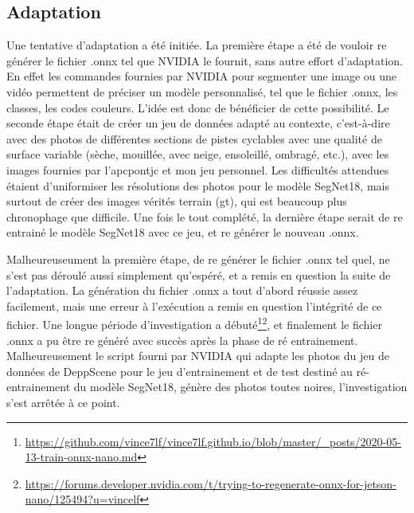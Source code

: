 \subsection{Adaptation}
\par Une tentative d'adaptation a été initiée. La première étape a été de vouloir re générer le fichier .onnx tel que NVIDIA le fournit, sans autre effort d'adaptation. En effet les commandes fournies par NVIDIA pour segmenter une image ou une vidéo permettent de préciser un modèle personnalisé, tel que le fichier .onnx, les classes, les codes couleurs. L'idée est donc de bénéficier de cette possibilité. Le seconde étape était de créer un jeu de données adapté au contexte, c'est-à-dire avec des photos de différentes sections de pistes cyclables avec une qualité de surface variable (sèche, mouillée, avec neige, ensoleillé, ombragé, etc.), avec les images fournies par l'\acrshort{apcpontjc} et mon jeu personnel. Les difficultés attendues étaient d'uniformiser les résolutions des photos pour le modèle SegNet18, mais surtout de créer des images vérités terrain (\acrshort{gt}), qui est beaucoup plus chronophage que difficile. Une fois le tout complété, la dernière étape serait de re entrainé le modèle SegNet18 avec ce jeu, et re générer le nouveau .onnx. 
\par Malheureuseument la première étape, de re générer le fichier .onnx tel quel, ne s'est pas déroulé aussi simplement qu'espéré, et a remis en question la suite de l'adaptation. La génération du fichier .onnx a tout d'abord réussie assez facilement, mais une erreur à l'exécution a remis en question l'intégrité de ce fichier. Une longue période d'investigation a débuté\footnote{\url{https://github.com/vince7lf/vince7lf.github.io/blob/master/_posts/2020-05-13-train-onnx-nano.md}}\footnote{\url{https://forums.developer.nvidia.com/t/trying-to-regenerate-onnx-for-jetson-nano/125494?u=vincelf}}, et finalement le fichier .onnx a pu être re généré avec succès après la phase de ré entrainement. Malheureusement le script fourni par NVIDIA qui adapte les photos du jeu de données de DeppScene pour le jeu d'entrainement et de test destiné au ré-entrainement du modèle SegNet18, génère des photos toutes noires, l'investigation s'est arrêtée à ce point.
